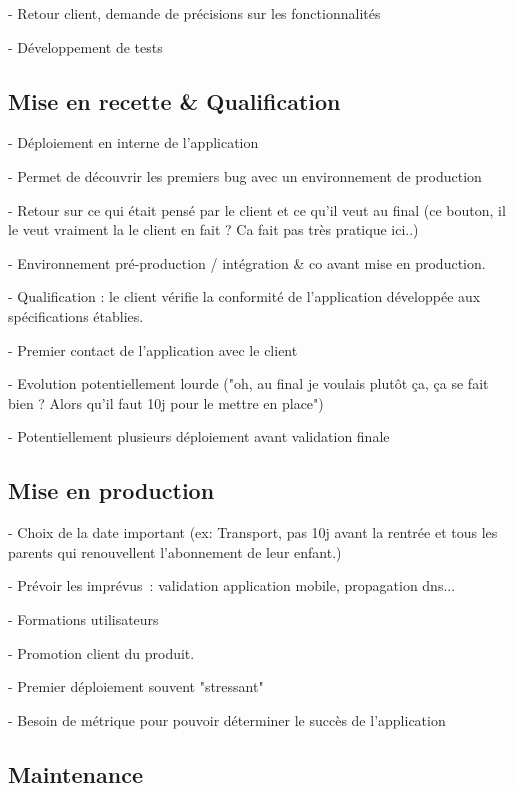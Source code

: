 - Retour client, demande de précisions sur les fonctionnalités

- Développement de tests


\subsection{Mise en recette \& Qualification}

- Déploiement en interne de l'application

- Permet de découvrir les premiers bug avec un environnement de production

- Retour sur ce qui était pensé par le client et ce qu'il veut au final (ce bouton, il le veut vraiment la le client en fait ? Ca fait pas très pratique ici..)

- Environnement pré-production / intégration \& co avant mise en production.


- Qualification : le client vérifie la conformité de l’application développée aux spécifications établies.

- Premier contact de l'application avec le client

- Evolution potentiellement lourde ("oh, au final je voulais plutôt ça, ça se fait bien ? Alors qu'il faut 10j pour le mettre en place")

- Potentiellement plusieurs déploiement avant validation finale

\subsection{Mise en production}

- Choix de la date important (ex: Transport, pas 10j avant la rentrée et tous les parents qui renouvellent l'abonnement de leur enfant.)

- Prévoir les imprévus : validation application mobile, propagation dns...

- Formations utilisateurs

- Promotion client du produit.

- Premier déploiement souvent "stressant"

- Besoin de métrique pour pouvoir déterminer le succès de l'application


\subsection{Maintenance}

